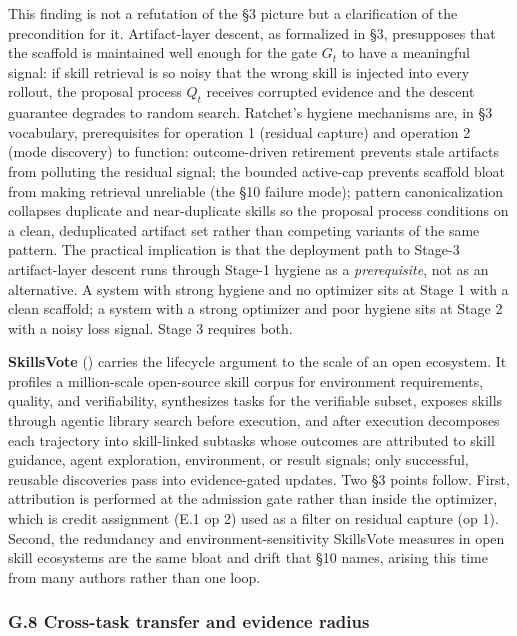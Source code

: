 \documentclass[
]{article}
\begin{document}
This finding is not a refutation of the §3 picture but a clarification
of the precondition for it. Artifact-layer descent, as formalized in §3,
presupposes that the scaffold is maintained well enough for the gate
\(G_t\) to have a meaningful signal: if skill retrieval is so noisy that
the wrong skill is injected into every rollout, the proposal process
\(Q_t\) receives corrupted evidence and the descent guarantee degrades
to random search. Ratchet's hygiene mechanisms are, in §3 vocabulary,
prerequisites for operation 1 (residual capture) and operation 2 (mode
discovery) to function: outcome-driven retirement prevents stale
artifacts from polluting the residual signal; the bounded active-cap
prevents scaffold bloat from making retrieval unreliable (the §10
failure mode); pattern canonicalization collapses duplicate and
near-duplicate skills so the proposal process conditions on a clean,
deduplicated artifact set rather than competing variants of the same
pattern. The practical implication is that the deployment path to
Stage-3 artifact-layer descent runs through Stage-1 hygiene as a
\emph{prerequisite}, not as an alternative. A system with strong hygiene
and no optimizer sits at Stage 1 with a clean scaffold; a system with a
strong optimizer and poor hygiene sits at Stage 2 with a noisy loss
signal. Stage 3 requires both.

\textbf{SkillsVote} () carries the lifecycle argument to the scale of an open ecosystem.
It profiles a million-scale open-source skill corpus for environment
requirements, quality, and verifiability, synthesizes tasks for the
verifiable subset, exposes skills through agentic library search before
execution, and after execution decomposes each trajectory into
skill-linked subtasks whose outcomes are attributed to skill guidance,
agent exploration, environment, or result signals; only successful,
reusable discoveries pass into evidence-gated updates. Two §3 points
follow. First, attribution is performed at the admission gate rather
than inside the optimizer, which is credit assignment (E.1 op 2) used as
a filter on residual capture (op 1). Second, the redundancy and
environment-sensitivity SkillsVote measures in open skill ecosystems are
the same bloat and drift that §10 names, arising this time from many
authors rather than one loop.

\subsubsection{G.8 Cross-task transfer and evidence
radius}\label{g.8-cross-task-transfer-and-evidence-radius}
\end{document}
